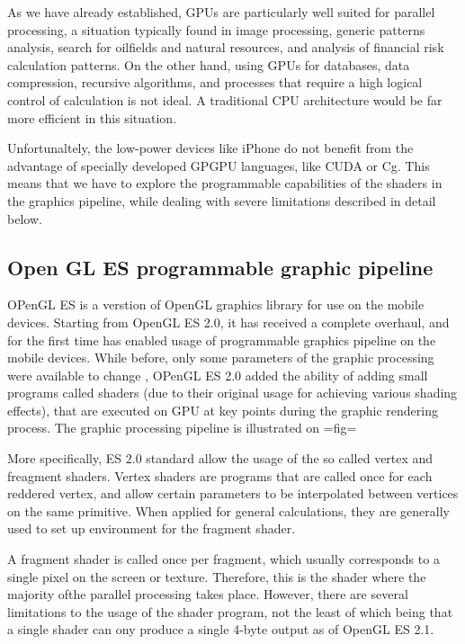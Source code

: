 As we have already established, GPUs are particularly well suited for parallel processing, a situation typically found in  image processing, generic patterns analysis, search for oilfields and natural resources, and analysis of financial risk calculation patterns. On the other hand, using GPUs for databases, data compression, recursive algorithms, and processes that require a high logical control of calculation is not ideal. A traditional CPU architecture would be far more efficient in this situation.

Unfortunaltely,  the low-power devices like iPhone do not benefit from the advantage of specially developed GPGPU languages, like CUDA or Cg. This means that we have to explore the programmable capabilities of the shaders in the graphics pipeline, while dealing with severe limitations described in detail below. 

\subsection{Open GL ES programmable graphic pipeline}

OPenGL ES is a verstion of OpenGL graphics library for use on the mobile devices. Starting from OpenGL ES 2.0, it has received a complete overhaul, and for the first time has enabled usage of programmable graphics pipeline on the mobile devices.  While before, only some parameters of the graphic processing were available to change , OPenGL ES 2.0 added the ability of adding small programs called shaders (due to their original usage for achieving various shading effects), that are executed on GPU at key points during the graphic rendering process. The graphic processing pipeline is illustrated on {{=fig=}} 

More specifically, ES 2.0 standard allow the usage of the so called vertex and freagment shaders. Vertex shaders are programs that are called once for each reddered vertex, and allow certain parameters to be interpolated between vertices on the same primitive. When applied for general calculations, they are generally used to set up environment for the fragment shader.

A fragment shader is called once per fragment, which usually corresponds to a single pixel on the screen or texture. Therefore, this is the shader where the majority ofthe parallel processing takes place. However, there are several limitations to the usage of the shader program, not the least of which being that a single shader can ony produce a single 4-byte output  as of OpenGL ES 2.1. 


